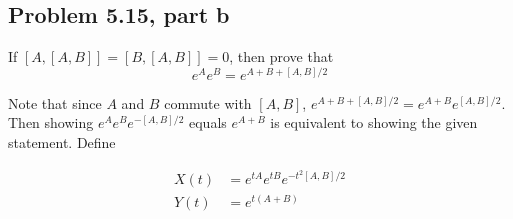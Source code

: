 \subsection{Problem 5.15, part b}
If $[A, [A, B]] = [B, [A, B]] = 0$, then prove that
\[e^Ae^B = e^{A + B + [A, B] / 2}\]
\partbreak
\begin{solution}

    Note that since $A$ and $B$ commute with $[A, B]$, $e^{A + B + [A, B] / 2} = e^{A + B} e^{[A, B] / 2}$. Then showing $e^Ae^Be^{-[A, B]/2}$ equals $e^{A + B}$ is equivalent to showing the given statement. Define

    \begin{align*}
        X(t) &= e^{tA}e^{tB}e^{-t^2[A, B]/2}\\
        Y(t) &= e^{t(A + B)}
    \end{align*}


\end{solution}
